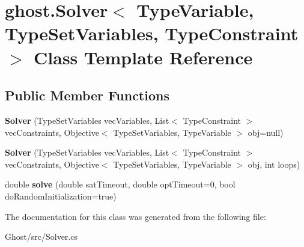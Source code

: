 \hypertarget{classghost_1_1Solver_3_01TypeVariable_00_01TypeSetVariables_00_01TypeConstraint_01_4}{\section{ghost.\-Solver$<$ Type\-Variable, Type\-Set\-Variables, Type\-Constraint $>$ Class Template Reference}
\label{classghost_1_1Solver_3_01TypeVariable_00_01TypeSetVariables_00_01TypeConstraint_01_4}
}
\subsection*{Public Member Functions}
\begin{DoxyCompactItemize}
\item 
\hypertarget{classghost_1_1Solver_3_01TypeVariable_00_01TypeSetVariables_00_01TypeConstraint_01_4_a09dc7b1660980591f5f60619420d44ca}{{\bfseries Solver} (Type\-Set\-Variables vec\-Variables, List$<$ Type\-Constraint $>$ vec\-Constraints, Objective$<$ Type\-Set\-Variables, Type\-Variable $>$ obj=null)}\label{classghost_1_1Solver_3_01TypeVariable_00_01TypeSetVariables_00_01TypeConstraint_01_4_a09dc7b1660980591f5f60619420d44ca}

\item 
\hypertarget{classghost_1_1Solver_3_01TypeVariable_00_01TypeSetVariables_00_01TypeConstraint_01_4_a83d8d09f96d154da1d928288a36ea0e2}{{\bfseries Solver} (Type\-Set\-Variables vec\-Variables, List$<$ Type\-Constraint $>$ vec\-Constraints, Objective$<$ Type\-Set\-Variables, Type\-Variable $>$ obj, int loops)}\label{classghost_1_1Solver_3_01TypeVariable_00_01TypeSetVariables_00_01TypeConstraint_01_4_a83d8d09f96d154da1d928288a36ea0e2}

\item 
\hypertarget{classghost_1_1Solver_3_01TypeVariable_00_01TypeSetVariables_00_01TypeConstraint_01_4_a9ad3017bd3ff361497491766214fdacd}{double {\bfseries solve} (double sat\-Timeout, double opt\-Timeout=0, bool do\-Random\-Initialization=true)}\label{classghost_1_1Solver_3_01TypeVariable_00_01TypeSetVariables_00_01TypeConstraint_01_4_a9ad3017bd3ff361497491766214fdacd}

\end{DoxyCompactItemize}


The documentation for this class was generated from the following file\-:\begin{DoxyCompactItemize}
\item 
Ghost/src/Solver.\-cs\end{DoxyCompactItemize}
